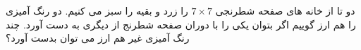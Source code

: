 \exercise
دو تا از خانه های صفحه شطرنجی
$7\times7$
را زرد و بقیه را سبز می کنیم. دو رنگ آمیزی را هم ارز گوییم اگر بتوان یکی را با دوران صفحه شطرنج از دیگری به دست آورد. چند رنگ آمیزی غیر هم ارز می توان بدست آورد؟